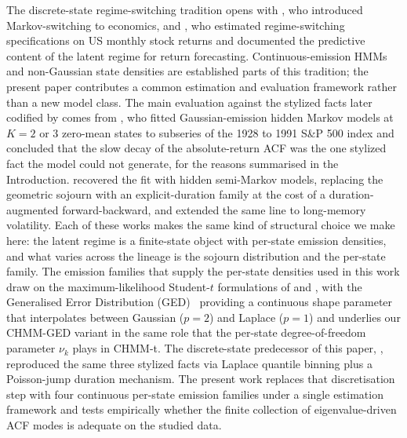 The discrete-state regime-switching tradition opens with \citet{hamilton1989new}, who introduced Markov-switching to economics, and \citet{schaller1997regime}, who estimated regime-switching specifications on US monthly stock returns and documented the predictive content of the latent regime for return forecasting. Continuous-emission HMMs and non-Gaussian state densities are established parts of this tradition; the present paper contributes a common estimation and evaluation framework rather than a new model class. The main evaluation against the stylized facts later codified by \citet{cont2001empirical} comes from \citet{ryden1998stylized}, who fitted Gaussian-emission hidden Markov models at $K = 2$ or $3$ zero-mean states to subseries of the 1928 to 1991 S\&P 500 index and concluded that the slow decay of the absolute-return ACF was the one stylized fact the model could not generate, for the reasons summarised in the Introduction. \citet{bulla2006stylized} recovered the fit with hidden semi-Markov models, replacing the geometric sojourn with an explicit-duration family at the cost of a duration-augmented forward-backward, and \citet{nystrup2017long} extended the same line to long-memory volatility. Each of these works makes the same kind of structural choice we make here: the latent regime is a finite-state object with per-state emission densities, and what varies across the lineage is the sojourn distribution and the per-state family. The emission families that supply the per-state densities used in this work draw on the maximum-likelihood Student-$t$ formulations of \citet{peel2000robust} and \citet{liu1995ml}, with the Generalised Error Distribution (GED)~\cite{subbotin1923law, box1973bayesian} providing a continuous shape parameter that interpolates between Gaussian ($p = 2$) and Laplace ($p = 1$) and underlies our CHMM-GED variant in the same role that the per-state degree-of-freedom parameter $\nu_k$ plays in CHMM-t. The discrete-state predecessor of this paper, \citet{alswaidan2026hybrid}, reproduced the same three stylized facts via Laplace quantile binning plus a Poisson-jump duration mechanism. The present work replaces that discretisation step with four continuous per-state emission families under a single estimation framework and tests empirically whether the finite collection of eigenvalue-driven ACF modes is adequate on the studied data.

